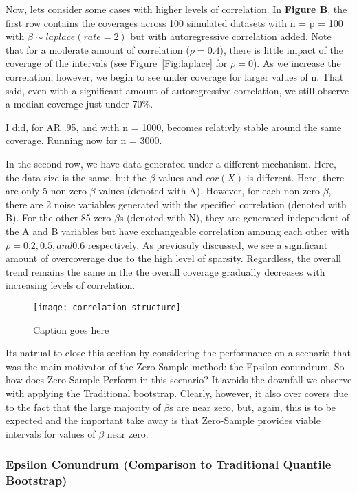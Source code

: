 Now, lets consider some cases with higher levels of correlation. In \textbf{Figure B}, the first row contains the coverages across 100 simulated datasets with n = p = 100 with $\beta \sim laplace(rate = 2)$ but with autoregressive correlation added. Note that for a moderate amount of correlation ($\rho = 0.4$), there is little impact of the coverage of the intervals (see Figure~\ref{Fig:laplace} for $\rho = 0$).  As we increase the correlation, however, we begin to see under coverage for larger values of n. That said, even with a significant amount of autoregressive correlation, we still observe a median coverage just under 70\%.

I did, for AR .95, and with n = 1000, becomes relativly stable around the same coverage. Running now for n = 3000.

In the second row, we have data generated under a different mechanism. Here, the data size is the same, but the $\beta$ values and $cor(X)$ is different. Here, there are only 5 non-zero $\beta$ values (denoted with A). However, for each non-zero $\beta$, there are 2 noise variables generated with the specified correlation (denoted with B). For the other 85 zero $\beta$s (denoted with N), they are generated independent of the A and B variables but have exchangeable correlation amoung each other with $\rho = 0.2, 0.5, and 0.6$ respectively. As previosuly discussed, we see a significant amount of overcoverage due to the high level of sparsity. Regardless, the overall trend remains the same in the the overall coverage gradually decreases with increasing levels of correlation.

\begin{figure}
  \texttt{[image: correlation\_structure]}
  \caption{\label{Fig:correlation_structure} Caption goes here}
\end{figure}

Its natrual to close this section by considering the performance on a scenario that was the main motivator of the Zero Sample method: the Epsilon conundrum. So how does Zero Sample Perform in this scenario? It avoids the downfall we observe with applying the Traditional bootstrap. Clearly, however, it also over covers due to the fact that the large majority of $\beta$s are near zero, but, again, this is to be expected and the important take away is that Zero-Sample provides viable intervals for values of $\beta$ near zero.

\subsubsection{Epsilon Conundrum (Comparison to Traditional Quantile Bootstrap)}

